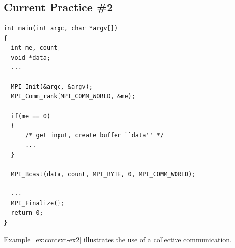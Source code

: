 \subsection{Current Practice \#2}
\begin{example}
\label{ex:context-ex2}
\begin{lstlisting}[language={[MPI]C}]
int main(int argc, char *argv[])
{
  int me, count;
  void *data;
  ...

  MPI_Init(&argc, &argv);
  MPI_Comm_rank(MPI_COMM_WORLD, &me);

  if(me == 0)
  {
      /* get input, create buffer ``data'' */
      ...
  }

  MPI_Bcast(data, count, MPI_BYTE, 0, MPI_COMM_WORLD);

  ...
  MPI_Finalize();
  return 0;
}
\end{lstlisting}
Example~\ref{ex:context-ex2} illustrates the use of a collective communication.
\end{example}


